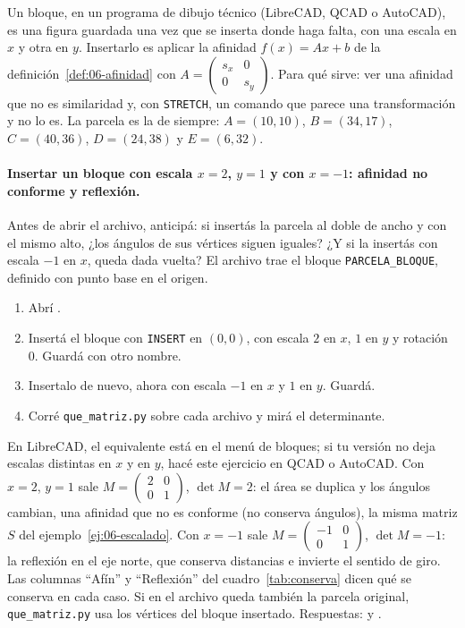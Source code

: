 Un bloque, en un programa de dibujo técnico (LibreCAD, QCAD o AutoCAD), es una figura guardada
una vez que se inserta donde haga falta, con una escala en \(x\) y otra en \(y\). Insertarlo es
aplicar la afinidad \(f(x)=Ax+b\) de la definición~\ref{def:06-afinidad} con
\(A=\left(\begin{smallmatrix}s_x&0\\0&s_y\end{smallmatrix}\right)\). Para qué sirve: ver una
afinidad que no es similaridad y, con \texttt{STRETCH}, un comando que parece una
transformación y no lo es. La parcela es la de siempre: \(A=(10,10)\), \(B=(34,17)\),
\(C=(40,36)\), \(D=(24,38)\) y \(E=(6,32)\).

\paragraph{Insertar un bloque con escala \(x=2\), \(y=1\) y con \(x=-1\): afinidad no conforme
y reflexión.} Antes de abrir el archivo, anticipá: si insertás la parcela al doble de ancho y
con el mismo alto, ¿los ángulos de sus vértices siguen iguales? ¿Y si la insertás con escala
\(-1\) en \(x\), queda dada vuelta? El archivo trae el bloque \texttt{PARCELA\_BLOQUE}, definido
con punto base en el origen.
\begin{enumerate}
  \item Abrí .
  \item Insertá el bloque con \texttt{INSERT} en \((0,0)\), con escala \(2\) en \(x\), \(1\) en
  \(y\) y rotación \(0\). Guardá con otro nombre.
  \item Insertalo de nuevo, ahora con escala \(-1\) en \(x\) y \(1\) en \(y\). Guardá.
  \item Corré \texttt{que\_matriz.py} sobre cada archivo y mirá el determinante.
\end{enumerate}
En LibreCAD, el equivalente está en el menú de bloques; si tu versión no deja escalas distintas
en \(x\) y en \(y\), hacé este ejercicio en QCAD o AutoCAD. Con \(x=2\), \(y=1\) sale
\(M=\left(\begin{smallmatrix}2&0\\0&1\end{smallmatrix}\right)\), \(\det M=2\): el área se
duplica y los ángulos cambian, una afinidad que no es conforme (no conserva ángulos), la misma
matriz \(S\) del ejemplo~\ref{ej:06-escalado}. Con \(x=-1\) sale
\(M=\left(\begin{smallmatrix}-1&0\\0&1\end{smallmatrix}\right)\), \(\det M=-1\): la reflexión
en el eje norte, que conserva distancias e invierte el sentido de giro. Las columnas \enquote{Afín} y \enquote{Reflexión}
del cuadro~\ref{tab:conserva} dicen qué se conserva en cada caso. Si en el archivo queda también la
parcela original, \texttt{que\_matriz.py} usa los vértices del bloque insertado. Respuestas:
 y .

